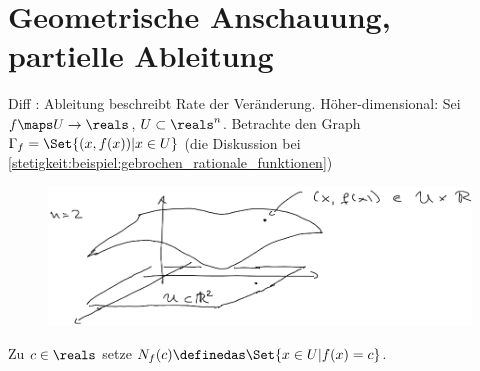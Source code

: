 \section*{Geometrische Anschauung, partielle Ableitung}
Diff : Ableitung beschreibt Rate der Veränderung. Höher-dimensional: Sei \( f\maps U\to \reals \), \( U\subset \reals^n \). Betrachte den Graph \( \Gamma_f=\Set{(x,f(x))|x\in U} \) (\vgl die Diskussion bei \ref{stetigkeit:beispiel:gebrochen_rationale_funktionen})
\begin{figure}[H]
    \centering
    \includegraphics[width=0.8\linewidth]{figures/r2_zu_r_funktion_veranschaulichung}
    \label{fig:r2_zu_r_funktion_veranschaulichung}
\end{figure}
\begin{definition*}
    Zu \( c\in \reals \) setze \( N_f(c)\definedas \Set{x\in U|f(x)=c} \).
\end{definition*}
